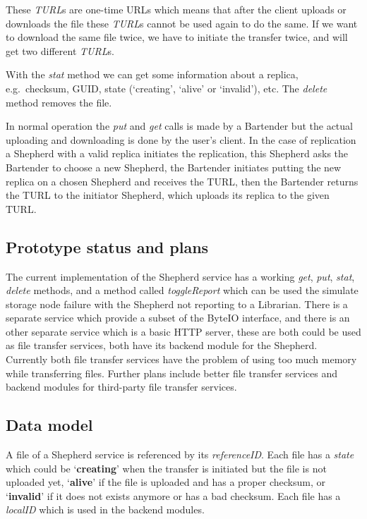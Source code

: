\documentclass{book}
\begin{document}
These \emph{TURL}s are one-time URLs which means that after the client uploads or downloads the file these \emph{TURL}s cannot be used again to do the same. If we want to download the same file twice, we have to initiate the transfer twice, and will get two different \emph{TURL}s.

With the \emph{stat} method we can get some information about a replica, e.g.~checksum, GUID, state (`creating', `alive' or `invalid'), etc. The \emph{delete} method removes the file.

In normal operation the \emph{put} and \emph{get} calls is made by a Bartender but the actual uploading and downloading is done by the user's client. In the case of replication a Shepherd with a valid replica initiates the replication, this Shepherd asks the Bartender to choose a new Shepherd, the Bartender initiates putting the new replica on a chosen Shepherd and receives the TURL, then the Bartender returns the TURL to the initiator Shepherd, which uploads its replica to the given TURL.


\subsection{Prototype status and plans} %

The current implementation of the Shepherd service has a working \emph{get}, \emph{put}, \emph{stat}, \emph{delete} methods, and a method called \emph{toggleReport} which can be used the simulate storage node failure with the Shepherd not reporting to a Librarian. 
There is a separate service which provide a subset of the ByteIO interface, and there is an other separate service which is a basic HTTP server, these are both could be used as file transfer services, both have its backend module for the Shepherd. Currently both file transfer services have the problem of using too much memory while transferring files.
Further plans include better file transfer services and backend modules for third-party file transfer services.


\subsection{Data model} %

A file of a Shepherd service is referenced by its \emph{referenceID}. Each file has a \emph{state} which could be `\textbf{creating}' when the transfer is initiated but the file is not uploaded yet, `\textbf{alive}' if the file is uploaded and has a proper checksum, or `\textbf{invalid}' if it does not exists anymore or has a bad checksum. Each file has a \emph{localID} which is used in the backend modules.
\end{document}
